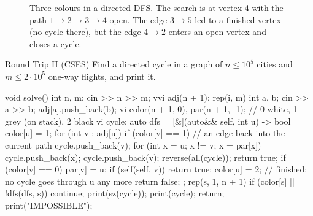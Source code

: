 \begin{figure}[htbp]
\centering
{}
\caption{Three colours in a directed DFS. The search is at vertex 4 with the path $1 \to 2 \to 3 \to 4$ open. The edge
$3 \to 5$ led to a finished vertex (no cycle there), but the edge $4 \to 2$ enters an open vertex and closes a cycle.}
\label{fig:dircycle}
\end{figure}

\begin{problem}{Round Trip II (CSES)}
Find a directed cycle in a graph of $n \le 10^5$ cities and $m \le 2\cdot10^5$ one-way flights, and print it.
\end{problem}

\begin{code}
void solve() {
    int n, m;
    cin >> n >> m;
    vvi adj(n + 1);
    rep(i, m) {
        int a, b;
        cin >> a >> b;
        adj[a].push_back(b);
    }
    vi color(n + 1, 0), par(n + 1, -1);  // 0 white, 1 grey (on stack), 2 black
    vi cycle;
    auto dfs = [&](auto&& self, int u) -> bool {
        color[u] = 1;
        for (int v : adj[u]) {
            if (color[v] == 1) {  // an edge back into the current path
                cycle.push_back(v);
                for (int x = u; x != v; x = par[x]) cycle.push_back(x);
                cycle.push_back(v);
                reverse(all(cycle));
                return true;
            }
            if (color[v] == 0) {
                par[v] = u;
                if (self(self, v)) return true;
            }
        }
        color[u] = 2;  // finished: no cycle goes through u any more
        return false;
    };
    rep(s, 1, n + 1) {
        if (color[s] || !dfs(dfs, s)) continue;
        print(sz(cycle));
        print(cycle);
        return;
    }
    print("IMPOSSIBLE");
}
\end{code}

